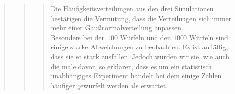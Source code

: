 \begin{quote}
\begin{quote}
\begin{quote}
                Die Häufigkeitsverteilungen aus den drei Simulationen bestätigen die Vermutung, dass die Verteilungen
                sich immer mehr einer Gaußnormalverteilung anpassen.\\
                Besonders bei den $100$ Würfeln und den $1000$ Würfeln sind einige starke Abweichungen zu beobachten. Es
                ist auffällig, dass sie so stark ausfallen. Jedoch würden wir sie, wie auch die male davor, so erklären,
                dass es um ein statistisch unabhängiges Experiment handelt bei dem einige Zahlen häufiger gewürfelt
                werden als erwartet.
		\end{quote}
    \end{quote}
\end{quote}

